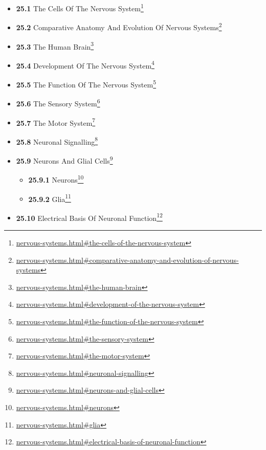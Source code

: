 \documentclass[
]{article}
\providecommand{\tightlist}{%
  \setlength{\itemsep}{0pt}\setlength{\parskip}{0pt}}
\providecommand{\tightlist}{%
  \setlength{\itemsep}{0pt}\setlength{\parskip}{0pt}}
\let\rmarkdownfootnote\footnote%
\def\footnote{\protect\rmarkdownfootnote}
\renewcommand{\href}[2]{#2\footnote{\url{#1}}}
\theoremstyle{definition}
\theoremstyle{definition}
\theoremstyle{definition}
\theoremstyle{remark}
\begin{document}
\begin{itemize}
  \begin{itemize}
  \tightlist
  \item
    \href{nervous-systems.html\#the-cells-of-the-nervous-system}{\emph{}\textbf{25.1}
    The Cells Of The Nervous System}
  \item
    \href{nervous-systems.html\#comparative-anatomy-and-evolution-of-nervous-systems}{\emph{}\textbf{25.2}
    Comparative Anatomy And Evolution Of Nervous Systems}
  \item
    \href{nervous-systems.html\#the-human-brain}{\emph{}\textbf{25.3}
    The Human Brain}
  \item
    \href{nervous-systems.html\#development-of-the-nervous-system}{\emph{}\textbf{25.4}
    Development Of The Nervous System}
  \item
    \href{nervous-systems.html\#the-function-of-the-nervous-system}{\emph{}\textbf{25.5}
    The Function Of The Nervous System}
  \item
    \href{nervous-systems.html\#the-sensory-system}{\emph{}\textbf{25.6}
    The Sensory System}
  \item
    \href{nervous-systems.html\#the-motor-system}{\emph{}\textbf{25.7}
    The Motor System}
  \item
    \href{nervous-systems.html\#neuronal-signalling}{\emph{}\textbf{25.8}
    Neuronal Signalling}
  \item
    \href{nervous-systems.html\#neurons-and-glial-cells}{\emph{}\textbf{25.9}
    Neurons And Glial Cells}

    \begin{itemize}
    \tightlist
    \item
      \href{nervous-systems.html\#neurons}{\emph{}\textbf{25.9.1}
      Neurons}
    \item
      \href{nervous-systems.html\#glia}{\emph{}\textbf{25.9.2} Glia}
    \end{itemize}
  \item
    \href{nervous-systems.html\#electrical-basis-of-neuronal-function}{\emph{}\textbf{25.10}
    Electrical Basis Of Neuronal Function}


\end{itemize}
\end{itemize}
\end{document}

